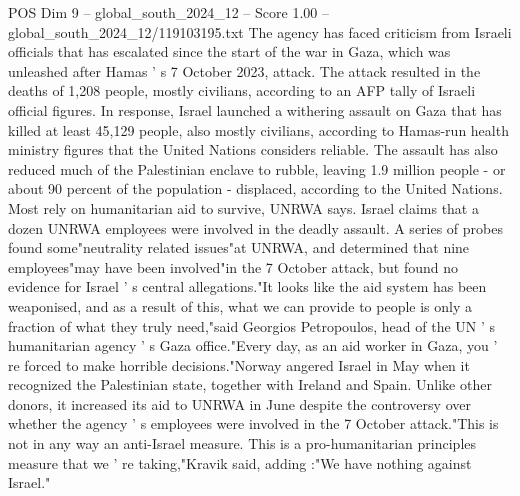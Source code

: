 \begin{textsample}{POS Dim 9 – global\_south\_2024\_12 – Score 1.00 – global\_south\_2024\_12/119103195.txt}
The agency has faced criticism from Israeli officials that has escalated since the start of the war in Gaza, which was unleashed after Hamas ' s 7 October 2023, attack.
The attack resulted in the deaths of 1,208 people, mostly civilians, according to an AFP tally of Israeli official figures.
In response, Israel launched a withering assault on Gaza that has killed at least 45,129 people, also mostly civilians, according to Hamas-run health ministry figures that the United Nations considers reliable.
The assault has also reduced much of the Palestinian enclave to rubble, leaving 1.9 million people - or about 90 percent of the population - displaced, according to the United Nations.
Most rely on humanitarian aid to survive, UNRWA says.
Israel claims that a dozen UNRWA employees were involved in the deadly assault.
A series of probes found some"neutrality related issues"at UNRWA, and determined that nine employees"may have been involved"in the 7 October attack, but found no evidence for Israel ' s central allegations."It looks like the aid system has been weaponised, and as a result of this, what we can provide to people is only a fraction of what they truly need,"said Georgios Petropoulos, head of the UN ' s humanitarian agency ' s Gaza office."Every day, as an aid worker in Gaza, you ' re forced to make horrible decisions."Norway angered Israel in May when it recognized the Palestinian state, together with Ireland and Spain.
Unlike other donors, it increased its aid to UNRWA in June despite the controversy over whether the agency ' s employees were involved in the 7 October attack."This is not in any way an anti-Israel measure.
This is a pro-humanitarian principles measure that we ' re taking,"Kravik said, adding :"We have nothing against Israel."

\end{textsample}
